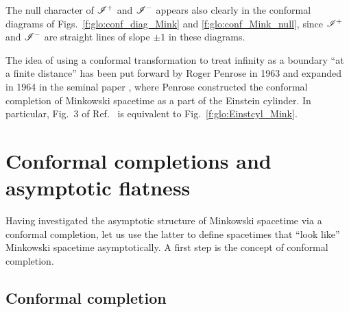 The null character of $\mathscr{I}^+$ and $\mathscr{I}^-$ appears also clearly in
the conformal diagrams of Figs.~\ref{f:glo:conf_diag_Mink}
and \ref{f:glo:conf_Mink_null}, since
$\mathscr{I}^+$ and $\mathscr{I}^-$ are straight lines of slope $\pm 1$ in these diagrams.


\begin{hist}
The idea of using a conformal transformation to treat infinity as a boundary
``at a finite distance'' has been put forward by Roger Penrose
in 1963 \cite{Penro63} and expanded in 1964 in the seminal paper \cite{Penro64},
where Penrose constructed the
conformal completion of Minkowski spacetime as a part of the Einstein cylinder.
In particular, Fig.~3 of Ref.~\cite{Penro64} is equivalent to Fig.~\ref{f:glo:Einstcyl_Mink}.
\end{hist}



\section{Conformal completions and asymptotic flatness} \label{s:glo:conf_compl}

Having investigated the asymptotic structure of Minkowski spacetime
via a conformal completion, let us use the latter to define spacetimes
that ``look like'' Minkowski spacetime asymptotically.
A first step is the concept of conformal completion.

\subsection{Conformal completion} \label{s:glo:def_conf_compl}

